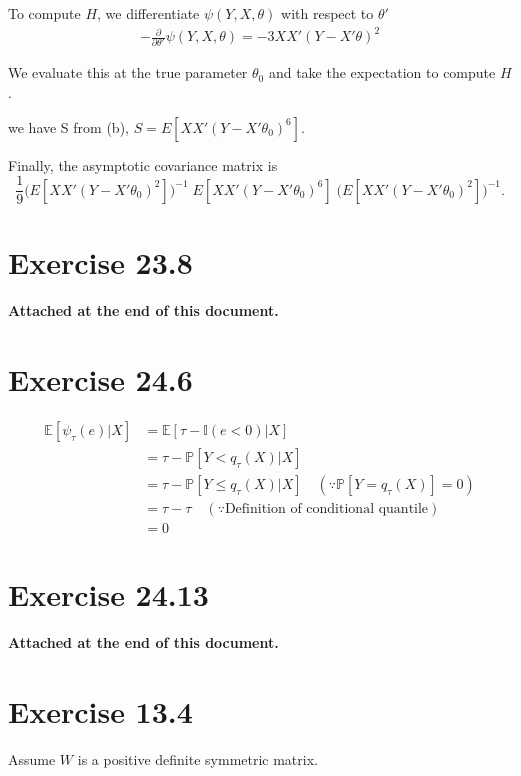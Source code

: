 \documentclass{article}
\begin{document}
\begin{itemize}
    To compute $H$, we differentiate $\psi(Y,X,\theta)$ with respect to $\theta'$
    \begin{align*}
         -\frac{\partial}{\partial \theta'} \psi(Y,X,\theta) = -3X X' (Y-X'\theta)^2
    \end{align*}

    We evaluate this at the true parameter $\theta_0$ and take the expectation to compute $H$.
    
    we have S from (b), $S = E\left[ X X' (Y-X'\theta_0)^6 \right]$.
    
    Finally, the asymptotic covariance matrix is
    \[
    \frac{1}{9}\bigl(E[X X' (Y-X'\theta_0)^2])^{-1}
          \; E\left[ X X' (Y-X'\theta_0)^6 \right]\;
          \bigl(E[X X' (Y-X'\theta_0)^2])^{-1}.
    \]
\end{itemize}


\section{Exercise 23.8}
\textbf{Attached at the end of this document.}

\section{Exercise 24.6}

\begin{align*}
    \mathbb{E}[\psi_\tau(e)|X] &= \mathbb{E}[\tau - \mathbb{I} (e<0)|X] \\
    &= \tau - \mathbb{P}[Y < q_\tau(X)|X]\\
    &= \tau - \mathbb{P}[Y \leq q_\tau(X)|X] \quad(\because \mathbb{P}[Y = q_\tau(X)] = 0)\\
    &= \tau - \tau \quad(\because \text{Definition of conditional quantile})\\
    &= 0
\end{align*}

\section{Exercise 24.13}
\textbf{Attached at the end of this document.}
 
\section{Exercise 13.4}
Assume $W$ is a positive definite symmetric matrix.
\end{document}
